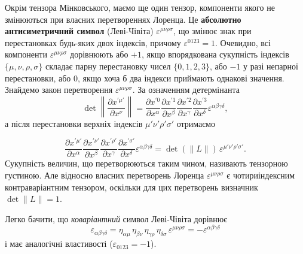 Окрім тензора Мінковського, маємо ще один тензор, компоненти якого не змінюються при власних перетвореннях Лоренца. Це
\textbf{абсолютно антисиметричний символ} (Леві-Чівіта) $\varepsilon^{\mu\nu\rho\sigma}$, що змінює знак при
перестановках будь-яких двох індексів, причому $\varepsilon^{0123} = 1$. Очевидно, всі компоненти
$\varepsilon^{\mu\nu\rho\sigma}$ дорівнюють або $+1$, якщо впорядкована сукупність індексів $\{\mu, \nu, \rho, \sigma\}$
складає парну перестановку чисел $\{0,1,2,3\}$, або $-1$ у разі непарної перестановки, або $0$, якщо хоча б два індекси
приймають однакові значення. Знайдемо закон перетворення $\varepsilon^{\mu\nu\rho\sigma}$. За означенням детермінанта
\begin{equation*}
  \det\left\|\frac{\partial x^{\prime\mu'}}{\partial x^\nu}\right\|
  = \frac{\partial x^{\prime 0}}{\partial x^\alpha}
  \frac{\partial x^{\prime 1}}{\partial x^\beta}
  \frac{\partial x^{\prime 2}}{\partial x^\gamma}
  \frac{\partial x^{\prime 3}}{\partial x^\delta}
  \varepsilon^{\alpha\beta\gamma\delta},
\end{equation*}
а після перестановки верхніх індексів $\mu'\nu'\rho'\sigma'$ отримаємо

\begin{equation*}
  \frac{\partial x^{\prime\mu'}}{\partial x^\alpha}
  \frac{\partial x^{\prime\nu'}}{\partial x^\beta}
  \frac{\partial x^{\prime\rho'}}{\partial x^\gamma}
  \frac{\partial x^{\prime\sigma'}}{\partial x^\delta}
  \varepsilon^{\alpha\beta\gamma\delta}
  = \det(\|L\|)\,\varepsilon^{\mu'\nu'\rho'\sigma'}.
\end{equation*}
Сукупність величин, що перетворюються таким чином, називають тензорною густиною. Але відносно власних перетворень
Лоренца $\varepsilon^{\mu\nu\rho\sigma}$ є чотириіндексним контраваріантним тензором, оскільки для цих перетворень
визначник $\det \|L\| = 1$.

Легко бачити, що \textit{коваріантний} символ Леві-Чівіта дорівнює
\begin{equation*}
  \varepsilon_{\alpha\beta\gamma\delta}
  = \eta_{\alpha\mu}\,\eta_{\beta\nu}\,\eta_{\gamma\rho}\,\eta_{\delta\sigma}\,
  \varepsilon^{\mu\nu\rho\sigma}
  = -\varepsilon^{\alpha\beta\gamma\delta}
\end{equation*}
і має аналогічні властивості ($\varepsilon_{0123} = -1$).

